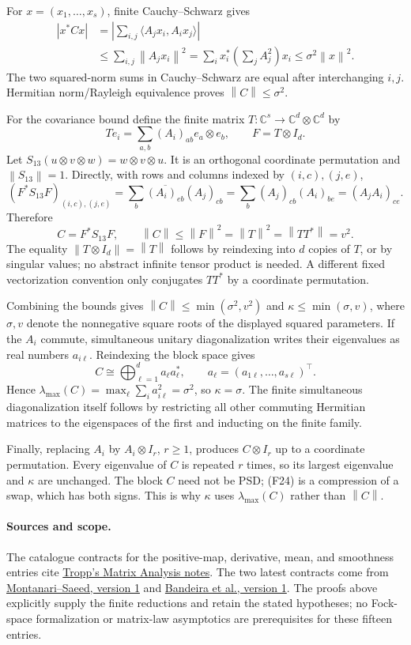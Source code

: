 \documentclass[11pt,a4paper]{article}
\newcommand{\C}{\mathbb C}
\newcommand{\norm}[1]{\left\lVert#1\right\rVert}
\begin{document}
For $x=(x_1,\ldots,x_s)$, finite Cauchy--Schwarz gives
\begin{align*}
 |x^*Cx|&=\left|\sum_{i,j}\langle A_jx_i,A_ix_j\rangle\right|\\
 &\le\sum_{i,j}\norm{A_jx_i}^2
 =\sum_i x_i^*\left(\sum_jA_j^2\right)x_i
 \le\sigma^2\norm x^2.
\end{align*}
The two squared-norm sums in Cauchy--Schwarz are equal after interchanging
$i,j$. Hermitian norm/Rayleigh equivalence proves $\norm C\le\sigma^2$.

For the covariance bound define the finite matrix
$T:\C^s\to\C^d\otimes\C^d$ by
\[
 Te_i=\sum_{a,b}(A_i)_{ab}e_a\otimes e_b,
 \qquad F=T\otimes I_d.
\]
Let $S_{13}(u\otimes v\otimes w)=w\otimes v\otimes u$.
It is an orthogonal coordinate permutation and $\norm{S_{13}}=1$.
Directly, with rows and columns indexed by $(i,c),(j,e)$,
\[
 (F^*S_{13}F)_{(i,c),(j,e)}
 =\sum_b\overline{(A_i)_{eb}}(A_j)_{cb}
 =\sum_b(A_j)_{cb}(A_i)_{be}=(A_jA_i)_{ce}.
\]
Therefore
\[
                 C=F^*S_{13}F,\qquad
 \norm C\le\norm F^2=\norm T^2=\norm{TT^*}=v^2.             \tag{F24}
\]
The equality $\norm{T\otimes I_d}=\norm T$ follows by reindexing into
$d$ copies of $T$, or by singular values; no abstract infinite tensor
product is needed. A different fixed vectorization convention only
conjugates $TT^*$ by a coordinate permutation.

Combining the bounds gives
$\norm C\le\min(\sigma^2,v^2)$ and
$\kappa\le\min(\sigma,v)$, where $\sigma,v$ denote the nonnegative
square roots of the displayed squared parameters. If the $A_i$ commute,
simultaneous unitary diagonalization writes their eigenvalues as real
numbers $a_{i\ell}$. Reindexing the block space gives
\[
 C\cong\bigoplus_{\ell=1}^d a_\ell a_\ell^*,
 \qquad a_\ell=(a_{1\ell},\ldots,a_{s\ell})^\top.
\]
Hence $\lambda_{\max}(C)=\max_\ell\sum_i a_{i\ell}^2=\sigma^2$,
so $\kappa=\sigma$. The finite simultaneous diagonalization itself follows
by restricting all other commuting Hermitian matrices to the eigenspaces
of the first and inducting on the finite family.

Finally, replacing $A_i$ by $A_i\otimes I_r$, $r\ge1$, produces $C\otimes I_r$
up to a coordinate permutation. Every eigenvalue of $C$ is repeated $r$
times, so its largest eigenvalue and $\kappa$ are unchanged. The block
$C$ need not be PSD; (F24) is a compression of a swap, which has both
signs. This is why $\kappa$ uses $\lambda_{\max}(C)$ rather than
$\norm C$.

\paragraph{Sources and scope.}
The catalogue contracts for the positive-map, derivative, mean, and
smoothness entries cite
\href{https://tropp.caltech.edu/notes/Tro22-Matrix-Analysis-LN.pdf}{Tropp's
Matrix Analysis notes}. The two latest contracts come from
\href{https://arxiv.org/abs/2606.27774v1}{Montanari--Saeed, version 1}
and \href{https://arxiv.org/abs/2610.01982v1}{Bandeira et al., version 1}.
The proofs above explicitly supply the finite reductions and retain the
stated hypotheses; no Fock-space formalization or matrix-law asymptotics
are prerequisites for these fifteen entries.
\end{document}
